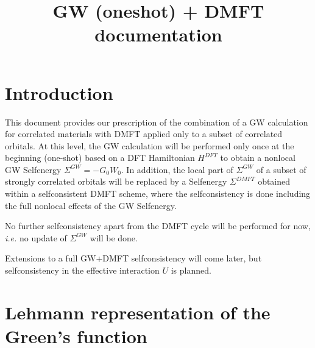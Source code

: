\documentclass[12pt,a4paper]{scrartcl}
\title{GW (oneshot) + DMFT documentation}
\numberwithin{equation}{section}
\newcommand{\GF}{Green's function}
\begin{document}
\maketitle
\tableofcontents

\clearpage

\section{Introduction}
This document  provides our prescription of the combination of a GW calculation 
for correlated materials with DMFT applied only to a subset of correlated 
orbitals. At this level, the GW calculation will be performed only once at the 
beginning (one-shot) based on a DFT Hamiltonian $H^{DFT}$ to obtain a nonlocal 
GW Selfenergy $\Sigma^{GW}=-G_0W_0$. In addition, the local part of 
$\Sigma^{GW}$ of a subset of strongly correlated orbitals will be replaced by a 
Selfenergy $\Sigma^{DMFT}$ obtained within a selfconsistent DMFT scheme, where 
the selfconsistency is done including the full nonlocal effects of the GW
Selfenergy.

No further selfconsistency apart from the DMFT cycle will be performed for now, 
\textit{i.e.} no update of $\Sigma^{GW}$ will be done. 

Extensions to a full GW+DMFT selfconsistency will come later,
but selfconsistency in the effective interaction $U$ is planned.

\clearpage

\section{Lehmann representation of the Green's function}
\end{document}
